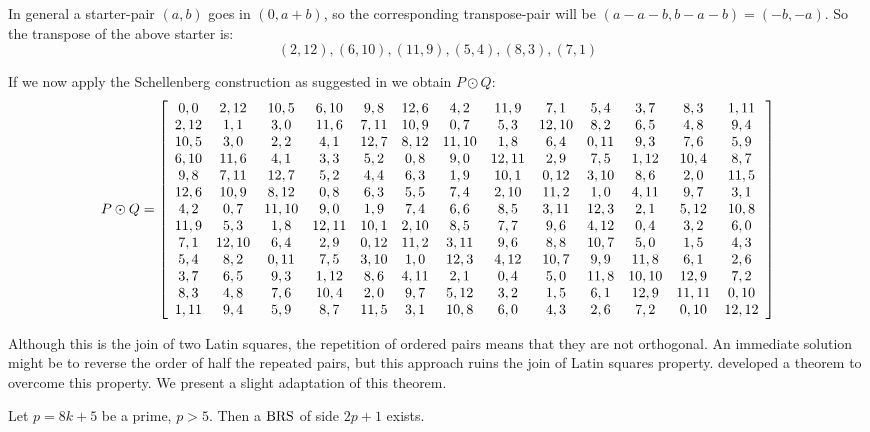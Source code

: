In general a starter-pair $(a, b)$ goes in $(0, a  +b)$, so the corresponding transpose-pair will be $(a - a - b, b - a - b) = (-b, -a)$. So the transpose of the above starter is:
$$(2, 12), (6, 10), (11, 9), (5, 4), (8, 3), (7, 1)$$

If we now apply the Schellenberg construction as suggested in
\cite{hwangCompleteBalancedHowell1984}
we obtain $P \odot Q$:
\begin{equation}
  P \odot Q = \left[\begin{array}{*{13}c}
   0,0  & 2,12  & 10,5  & 6,10  & 9,8  & 12,6 &  4,2  & 11,9  &  7,1  & 5,4  &  3,7  &  8,3  & 1,11 \\
   2,12 &  1,1  &  3,0  & 11,6  & 7,11 & 10,9 &  0,7  &  5,3  & 12,10 & 8,2  &  6,5  &  4,8  &  9,4 \\
   10,5 &  3,0  &  2,2  &  4,1  & 12,7 & 8,12 & 11,10 &  1,8  &  6,4  & 0,11 &  9,3  &  7,6  &  5,9 \\
   6,10 & 11,6  &  4,1  &  3,3  & 5,2  & 0,8  &  9,0  & 12,11 &  2,9  & 7,5  & 1,12  & 10,4  &  8,7 \\
   9,8  & 7,11  & 12,7  &  5,2  & 4,4  & 6,3  &  1,9  & 10,1  & 0,12  & 3,10 &  8,6  &  2,0  & 11,5 \\
   12,6 & 10,9  & 8,12  &  0,8  & 6,3  & 5,5  &  7,4  & 2,10  & 11,2  & 1,0  & 4,11  &  9,7  &  3,1 \\
   4,2  &  0,7  & 11,10 &  9,0  & 1,9  & 7,4  &  6,6  &  8,5  & 3,11  & 12,3 &  2,1  & 5,12  & 10,8 \\
   11,9 &  5,3  &  1,8  & 12,11 & 10,1 & 2,10 &  8,5  &  7,7  &  9,6  & 4,12 &  0,4  &  3,2  &  6,0 \\
   7,1  & 12,10 &  6,4  &  2,9  & 0,12 & 11,2 & 3,11  &  9,6  &  8,8  & 10,7 &  5,0  &  1,5  &  4,3 \\
   5,4  &  8,2  & 0,11  &  7,5  & 3,10 & 1,0  & 12,3  & 4,12  & 10,7  & 9,9  & 11,8  &  6,1  &  2,6 \\
   3,7  &  6,5  &  9,3  & 1,12  & 8,6  & 4,11 &  2,1  &  0,4  &  5,0  & 11,8 & 10,10 & 12,9  &  7,2 \\
   8,3  &  4,8  &  7,6  & 10,4  & 2,0  & 9,7  & 5,12  &  3,2  &  1,5  & 6,1  & 12,9  & 11,11 & 0,10 \\
   1,11 &  9,4  &  5,9  &  8,7  & 11,5 & 3,1  & 10,8  &  6,0  &  4,3  & 2,6  &  7,2  & 0,10  & 12,12 \\
  \end{array}\right]
\end{equation}

Although this is the join of two Latin squares, the repetition of ordered pairs means that they are not orthogonal.
An immediate solution might be to reverse the order of half the repeated pairs, but this approach ruins the join of Latin squares property.
\cite{andersonConstructionBalancedRoom1999} developed a theorem to overcome this property.
We present a slight adaptation of this theorem.
\begin{theorem}
Let $p = 8k + 5$ be a prime, $p > 5$.
Then a $\operatorname{BRS}$ of side $2p + 1$ exists.
\end{theorem}


